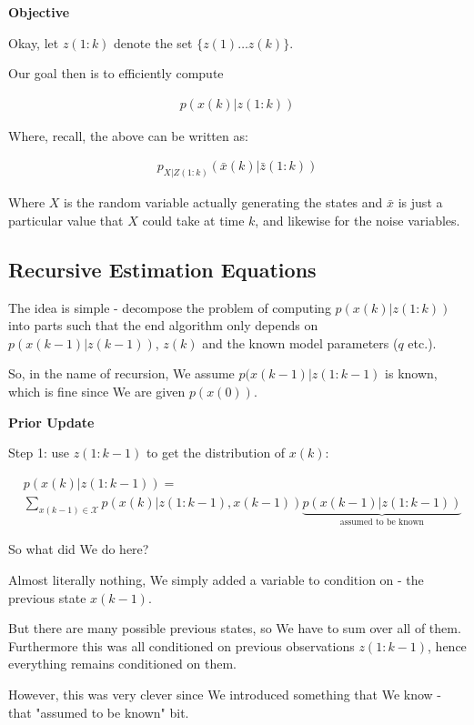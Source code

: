 \documentclass{article}
\begin{document}
		\textbf{Objective}
		
		Okay, let $z(1:k)$ denote the set $\{z(1)\ldots z(k)\}$. 
		
		Our goal then is to efficiently compute 
		
		\begin{align}
			p(x(k)|z(1:k))
		\end{align}
		
		Where, recall, the above can be written as:
		
		\begin{align}
			p_{X|Z(1:k)}(\bar{x}(k)|\bar{z}(1:k))
		\end{align}

		Where $X$ is the random variable actually generating the states and $\bar{x}$ is just a particular value that $X$ could take at time $k$, and likewise for the noise variables.
		
	\subsection{Recursive Estimation Equations}
	
		The idea is simple - decompose the problem of computing $p(x(k)|z(1:k))$ into parts such that the end algorithm only depends on $p(x(k-1)|z(k-1))$, $z(k)$ and the known model parameters ($q$ etc.).
		
		So, in the name of recursion, We assume $p(x(k-1)|z(1:k-1)$ is known, which is fine since We are given $p(x(0))$.
		
		\textbf{Prior Update}
		
		Step 1: use $z(1:k-1)$ to get the distribution of $x(k)$:
		
		\begin{align*}
			& p(x(k)|z(1:k-1)) =\\
			& \sum_{x(k-1)\in\mathcal{X}} p(x(k)|z(1:k-1), x(k-1))\underbrace{p(x(k-1)|z(1:k-1))}_{\text{assumed to be known}}
		\end{align*}
		
		So what did We do here?
		
		Almost literally nothing, We simply added a variable to condition on - the previous state $x(k-1)$. 
		
		But there are many possible previous states, so We have to sum over all of them. Furthermore this was all conditioned on previous observations $z(1:k-1)$, hence everything remains conditioned on them.
		
		However, this was very clever since We introduced something that We know - that "assumed to be known" bit. 
		
\end{document}
